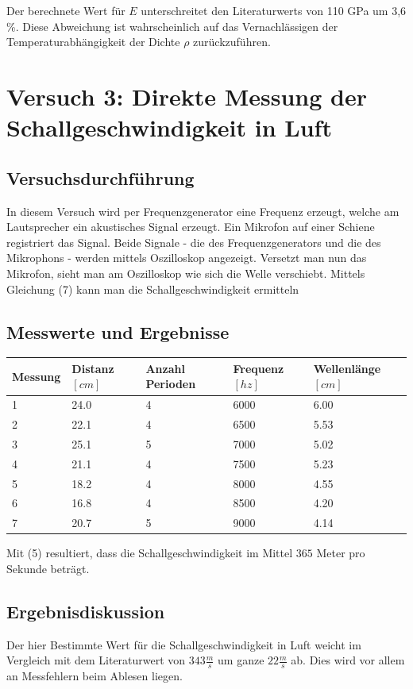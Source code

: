 \documentclass{scrartcl}
\begin{document}
Der berechnete Wert für $E$ unterschreitet den Literaturwerts von 110 GPa um 3,6 \%. Diese Abweichung ist wahrscheinlich auf das Vernachlässigen der Temperaturabhängigkeit der Dichte $\rho$ zurückzuführen.


\section{Versuch 3: Direkte Messung der Schallgeschwindigkeit in Luft}
\subsection{Versuchsdurchführung}
In diesem Versuch wird per Frequenzgenerator eine Frequenz erzeugt, welche am Lautsprecher ein akustisches Signal erzeugt. Ein Mikrofon auf einer Schiene registriert das Signal. Beide Signale - die des Frequenzgenerators und die des Mikrophons - werden mittels Oszilloskop angezeigt. 
Versetzt man nun das Mikrofon, sieht man am Oszilloskop wie sich die Welle verschiebt.
Mittels Gleichung (7) kann man die Schallgeschwindigkeit ermitteln
\subsection{Messwerte und Ergebnisse}
\begin{table}[H]
\begin{tabular}{l|l|l|l|l}
Messung & Distanz $[cm]$ & Anzahl Perioden & Frequenz $[hz]$ & Wellenlänge $[cm]$ \\ \hline
1       & 24.0          & 4 & 6000 & 6.00\\
2       & 22.1          & 4 & 6500 & 5.53\\
3       & 25.1          & 5 & 7000 & 5.02\\
4       & 21.1          & 4 & 7500 & 5.23\\
5       & 18.2          & 4 & 8000 & 4.55\\
6       & 16.8          & 4 & 8500 & 4.20\\
7       & 20.7          & 5 & 9000 & 4.14\\
\end{tabular}
\end{table}
Mit (5) resultiert, dass die Schallgeschwindigkeit im Mittel $365$ Meter pro Sekunde beträgt.
\subsection{Ergebnisdiskussion}
Der hier Bestimmte Wert für die Schallgeschwindigkeit in Luft weicht im  Vergleich mit dem Literaturwert von $343 \frac{m}{s}$ um ganze $22\frac{m}{s}$ ab. Dies wird vor allem an Messfehlern beim Ablesen liegen.
\end{document}
